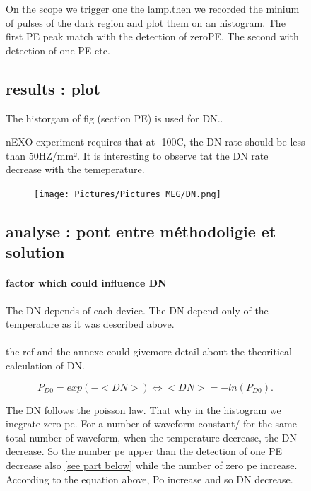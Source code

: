 \begin{figure}[!hbtp]
  On the scope we trigger one the lamp.then we recorded the minium of pulses of the dark region and plot
  them on an histogram. The first PE peak match with the detection of zeroPE. The second with detection of one PE etc. 
  
  \subsection{results : plot}
  
  The historgam of fig (section PE) is used for DN..
  
  nEXO experiment requires that at -100C, the DN rate should be less than 50HZ/mm². 
  It is interesting to observe tat the DN rate decrease with the temeperature. 
  
  \begin{figure}[!hbtp]
  \centering
  \texttt{[image: Pictures/Pictures\_MEG/DN.png]}
  \label{fig:pulse_shape}
  \end{figure}
  
  \subsection{analyse : pont entre méthodoligie et solution }
  
  \paragraph{factor which could influence DN}
  
  The DN depends of each device. The DN depend only of the temperature as it was described above. 
  
  \paragraph{}
  
  the ref and the annexe could givemore detail about the theoritical calculation of DN. 
  
  \begin{equation}
    P_{D0} =  exp(-<DN>) \iff <DN> = -ln(P_{D0}).
  \end{equation}
  
  The DN follows the poisson law. That why in the histogram we inegrate zero pe. For a number of waveform constant/
  for the same total number of waveform, when the temperature decrease, the DN decrease. So the number pe upper than the detection
  of one PE decrease also \ref{see part below} while the number of zero pe increase. 
  According to the equation above, Po increase and so DN decrease.   
  

\end{figure}
